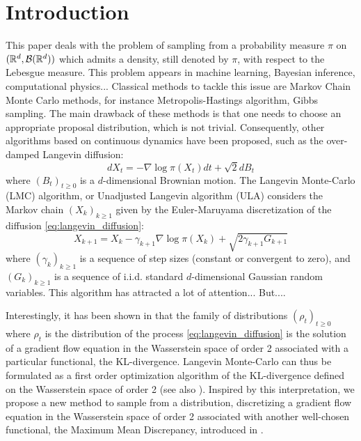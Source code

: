 
\section{Introduction}

This paper deals with the problem of sampling from a probability measure $\pi$ on $({{\mathbb R}}^d,\mathcal{B}({{\mathbb R}}^d))$ which admits a density, still denoted by $\pi$, with respect to the Lebesgue measure.
This problem appears in machine learning, Bayesian inference, computational physics... Classical methods to tackle this issue are Markov Chain Monte Carlo methods, for instance Metropolis-Hastings algorithm, Gibbs sampling. The main drawback of these methods is that one needs to choose an appropriate proposal distribution, which is not trivial. Consequently, other algorithms based on continuous dynamics have been proposed, such as the over-damped Langevin diffusion:
\begin{equation}\label{eq:langevin_diffusion}
dX_t= -\nabla \log \pi (X_t)dt+\sqrt{2}dB_t
\end{equation}
where $(B_t)_{t\ge0}$ is a $d$-dimensional Brownian motion. The Langevin Monte-Carlo (LMC) algorithm, or Unadjusted Langevin algorithm (ULA) considers the Markov chain $(X_k)_{k\ge1 }$ given by the Euler-Maruyama discretization of the diffusion \eqref{eq:langevin_diffusion}:
\begin{equation}
X_{k+1} = X_k - \gamma_{k+1}\nabla \log \pi(X_k) + \sqrt{2\gamma_{k+1}G_{k+1}}
\end{equation}
where $(\gamma_k)_{k\ge1}$ is a sequence of step sizes (constant or convergent to zero), and
$(G_k)_{k \ge 1}$ is a sequence of i.i.d. standard $d$-dimensional Gaussian random variables. This algorithm has attracted a lot of attention... But....

Interestingly, it has been shown in \cite{jordan1998variational} that the family of distributions $(\rho_t)_{t\ge 0}$ where $\rho_t$ is the distribution of the process \eqref{eq:langevin_diffusion} is the solution of a gradient
flow equation in the Wasserstein space of order 2 associated with a particular functional, the KL-divergence. Langevin Monte-Carlo can thus be formulated as a first order optimization algorithm of the KL-divergence defined on the Wasserstein space of order 2 (see also \cite{durmus2018analysis,bernton2018langevin}). Inspired by this interpretation, we propose a new method to sample from a distribution, discretizing a gradient
flow equation in the Wasserstein space of order 2 associated with another well-chosen functional, the Maximum Mean Discrepancy, introduced in \cite{gretton2012kernel}.


